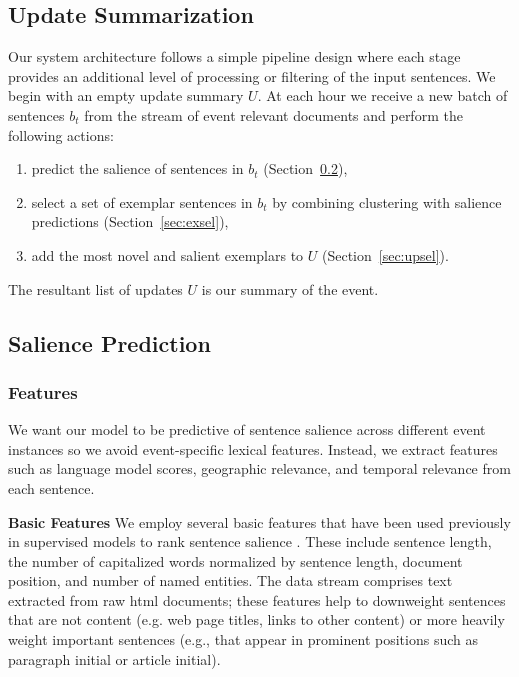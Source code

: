 \subsection{Update Summarization}


Our system architecture follows a simple pipeline design where each stage 
provides an additional level of processing or filtering of the input 
sentences. We begin with an empty update summary $U$. At each hour we receive 
a new batch of sentences $b_t$ from the stream of event relevant documents
and perform the following actions:
\begin{enumerate}
  \item predict the salience of sentences in $b_t$ (Section~\ref{sec:salpred}),
  \item select a set of exemplar sentences in $b_t$ by combining 
      clustering with 
      salience predictions (Section~\ref{sec:exsel}),
  \item add the most novel and salient exemplars 
      to $U$ (Section~\ref{sec:upsel}).
\end{enumerate}
The resultant list of updates $U$ is our summary of the event.


\subsection{Salience Prediction}
\label{sec:salpred}


\subsubsection{Features}
\label{sec:features}


We want our model to be predictive of sentence salience across different event instances so we avoid event-specific lexical features.  Instead, we extract features such as language model scores, geographic relevance, and temporal relevance from each sentence.  


\textbf{Basic Features}
We employ several basic features that have been used previously in supervised 
models to rank sentence salience \cite{kupiec1995trainable,conroy2001using}. 
These include sentence length, the number of capitalized words normalized by 
sentence length, document position, and number of named entities.  The data 
stream comprises text extracted from raw html documents; these features help 
to downweight sentences that are not content (e.g. web page titles, links to 
other content) or more heavily weight important sentences (e.g., that appear 
in prominent positions such as paragraph initial or article initial).


